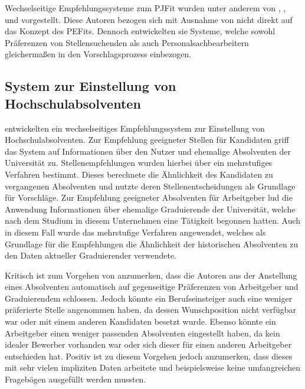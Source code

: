 Wechselseitige Empfehlungssysteme zum \ac{PJFit} wurden unter anderem von \textcite{buettner:2014}, \textcite{ding:2016}, \textcite{wenxing:2015} und \textcite{le:2019} vorgestellt. Diese Autoren bezogen sich mit Ausnahme von \textcite{buettner:2014} nicht direkt auf das Konzept des \acp{PEFit}. Dennoch entwickelten sie Systeme, welche sowohl Präferenzen von Stellensuchenden als auch Personalsachbearbeitern gleichermaßen in den Vorschlagsprozess einbezogen. 

\subsection{System zur Einstellung von Hochschulabsolventen}
\label{ch:verwandteArbeiten:nichtAufDemPEFitBasierendeBilateraleSysteme:absolventen}
\textcite[S. 1ff.]{ding:2016} entwickelten ein wechselseitiges Empfehlungssystem zur Einstellung von Hochschulabsolventen. Zur Empfehlung geeigneter Stellen für Kandidaten griff das System auf Informationen über den Nutzer und ehemalige Absolventen der Universität zu. Stellenempfehlungen wurden hierbei über ein mehrstufiges Verfahren bestimmt. Dieses berechnete die Ähnlichkeit des Kandidaten zu vergangenen Absolventen und nutzte deren Stellenentscheidungen als Grundlage für Vorschläge. Zur Empfehlung geeigneter Absolventen für Arbeitgeber lud die Anwendung Informationen über ehemalige Graduierende der Universität, welche nach dem Studium in diesem Unternehmen eine Tätigkeit begonnen hatten. Auch in diesem Fall wurde das mehrstufige Verfahren angewendet, welches als Grundlage für die Empfehlungen die Ähnlichkeit der historischen Absolventen zu den Daten aktueller Graduierender verwendete.

Kritisch ist zum Vorgehen von \textcite[S. 1ff.]{ding:2016} anzumerken, dass die Autoren aus der Anstellung eines Absolventen automatisch auf gegenseitige Präferenzen von Arbeitgeber und Graduierendem schlossen. Jedoch könnte ein Berufseinsteiger auch eine weniger präferierte Stelle angenommen haben, da dessen Wunschposition nicht verfügbar war oder mit einem anderen Kandidaten besetzt wurde. Ebenso könnte ein Arbeitgeber einen weniger passenden Absolventen eingestellt haben, da kein idealer Bewerber vorhanden war oder sich dieser für einen anderen Arbeitgeber entschieden hat. Positiv ist zu diesem Vorgehen jedoch anzumerken, dass dieses mit sehr vielen impliziten Daten arbeitete und beispielsweise keine umfangreichen Fragebögen ausgefüllt werden mussten.

